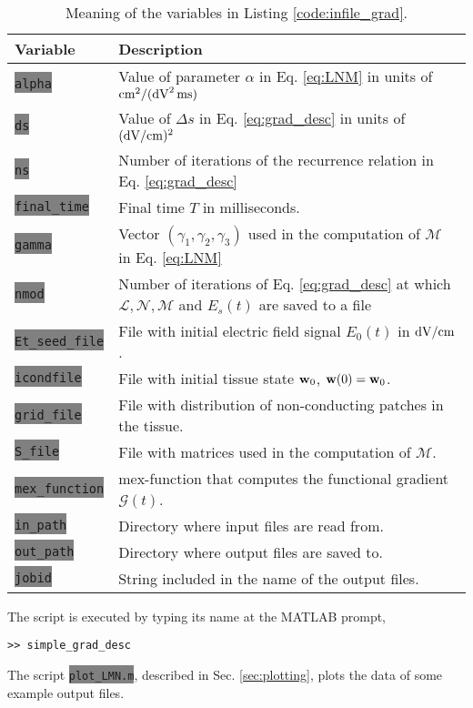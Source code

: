 \documentclass{article}
\newcommand{\code}[1]{\colorbox{gray}{\lstinline|#1|}}
\begin{document}
\begin{table}[h]
  \centering
  \begin{tabular}{|l|p{10cm}|}
    \hline
    {\bf Variable} & {\bf Description} \\ \hline
\code{alpha} & Value of parameter $\alpha$ in Eq. \eqref{eq:LNM} in units of ${\rm cm}^2/({\rm dV}^2\,{\rm ms})$\\ \hline
\code{ds} & Value of $\Delta s$ in Eq. \eqref{eq:grad_desc} in units of $({\rm dV}/{\rm cm})^2$\\ \hline
\code{ns} & Number of iterations of the recurrence relation in Eq. \eqref{eq:grad_desc}\\ \hline
\code{final_time} & Final time $T$  in milliseconds.\\ \hline
\code{gamma} & Vector $(\gamma_1, \gamma_2, \gamma_3)$ used in the computation of $\mathcal{M}$ in Eq. \eqref{eq:LNM} \\ \hline
\code{nmod} & Number of iterations of Eq. \eqref{eq:grad_desc} at which $\mathcal{L},\mathcal{N},\mathcal{M}$ and $E_s(t)$ are saved to a file\\ \hline
\code{Et_seed_file} & File with initial electric field signal $E_0(t)$ in ${\rm dV}/{\rm cm}$.\\ \hline
\code{icondfile} & File with initial tissue state ${\bf w}_0$, ${\bf w}(0) = {\bf w}_0$.\\ \hline
\code{grid_file} & File with distribution of non-conducting patches in the tissue. \\ \hline
\code{S_file} & File with matrices used in the computation of $\mathcal{M}$. \\ \hline
\code{mex_function} & mex-function that computes the functional gradient $\mathcal{G}(t)$. \\ \hline
\code{in_path} & Directory where input files are read from.\\ \hline
\code{out_path} & Directory where output files are saved to.\\ \hline
\code{jobid} & String included in the name of the output files. \\ \hline
  \end{tabular}
  \caption{Meaning of the variables in Listing \ref{code:infile_grad}.}
  \label{tab:input_grad}
\end{table}

The script is executed by typing its name at the MATLAB prompt,
\begin{lstlisting}
>> simple_grad_desc
\end{lstlisting}
The script \code{plot_LMN.m}, described in Sec. \ref{sec:plotting}, plots the data of some example output files.
\end{document}
